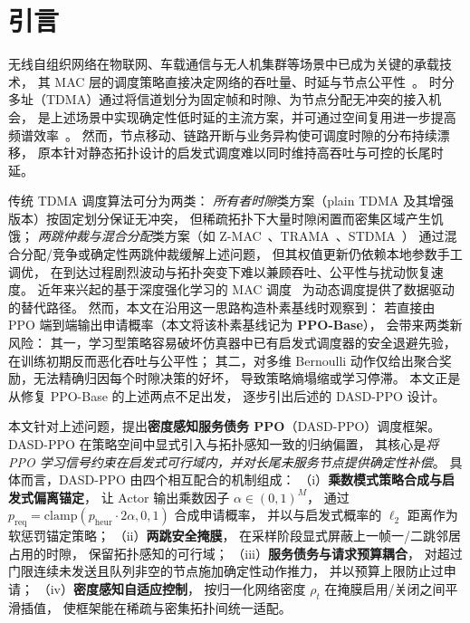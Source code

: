 \section{引言}
\label{sec:intro}

无线自组织网络在物联网、车载通信与无人机集群等场景中已成为关键的承载技术，
其 MAC 层的调度策略直接决定网络的吞吐量、时延与节点公平性~\cite{author2024survey}。
时分多址（TDMA）通过将信道划分为固定帧和时隙、为节点分配无冲突的接入机会，
是上述场景中实现确定性低时延的主流方案，并可通过空间复用进一步提高频谱效率~\cite{spatial_reuse}。
然而，节点移动、链路开断与业务异构使可调度时隙的分布持续漂移，
原本针对静态拓扑设计的启发式调度难以同时维持高吞吐与可控的长尾时延。

传统 TDMA 调度算法可分为两类：
\emph{所有者时隙}类方案（plain TDMA 及其增强版本）按固定划分保证无冲突，
但稀疏拓扑下大量时隙闲置而密集区域产生饥饿；
\emph{两跳仲裁与混合分配}类方案（如 Z-MAC~\cite{zmac}、TRAMA~\cite{trama}、STDMA~\cite{stdma}）
通过混合分配/竞争或确定性两跳仲裁缓解上述问题，
但其权值更新仍依赖本地参数手工调优，
在到达过程剧烈波动与拓扑突变下难以兼顾吞吐、公平性与扰动恢复速度。
近年来兴起的基于深度强化学习的 MAC 调度~\cite{drlmac2019,ppoma2023,mnih2015dqn}
为动态调度提供了数据驱动的替代路径。
然而，本文在沿用这一思路构造朴素基线时观察到：
若直接由 PPO 端到端输出申请概率（本文将该朴素基线记为 \textbf{PPO-Base}），
会带来两类新风险：
其一，学习型策略容易破坏仿真器中已有启发式调度器的安全退避先验，
在训练初期反而恶化吞吐与公平性；
其二，对多维 Bernoulli 动作仅给出聚合奖励，无法精确归因每个时隙决策的好坏，
导致策略熵塌缩或学习停滞。
本文正是从修复 PPO-Base 的上述两点不足出发，
逐步引出后述的 DASD-PPO 设计。

本文针对上述问题，提出\textbf{密度感知服务债务 PPO}（DASD-PPO）调度框架。
DASD-PPO 在策略空间中显式引入与拓扑感知一致的归纳偏置，
其核心是\emph{将 PPO 学习信号约束在启发式可行域内，并对长尾未服务节点提供确定性补偿}。
具体而言，DASD-PPO 由四个相互配合的机制组成：
（i）\textbf{乘数模式策略合成与启发式偏离锚定}，
让 Actor 输出乘数因子 \(\alpha\in(0,1)^M\)，
通过 \(p_\text{req}=\text{clamp}(p_\text{heur}\cdot 2\alpha,0,1)\) 合成申请概率，
并以与启发式概率的 \(\ell_2\) 距离作为软惩罚锚定策略；
（ii）\textbf{两跳安全掩膜}，
在采样阶段显式屏蔽上一帧一/二跳邻居占用的时隙，
保留拓扑感知的可行域；
（iii）\textbf{服务债务与请求预算耦合}，
对超过门限连续未发送且队列非空的节点施加确定性动作推力，
并以预算上限防止过申请；
（iv）\textbf{密度感知自适应控制}，
按归一化网络密度 \(\rho_t\) 在掩膜启用/关闭之间平滑插值，
使框架能在稀疏与密集拓扑间统一适配。

